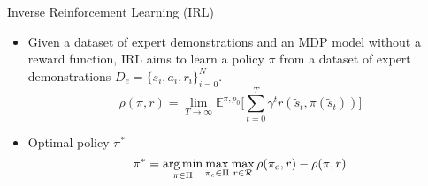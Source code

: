
\begin{block}{\normalsize{Inverse Reinforcement Learning (IRL)}}
  \begin{itemize}
     \item Given a dataset of expert demonstrations and an MDP model without a reward function, IRL aims to learn a policy $\pi$ 
       from a dataset of expert demonstrations $D_e = \{ s_i, a_i, r_i \}_{i=0}^{N}$.
     \[
       \rho(\pi, r) = \lim_{T \to \infty} \mathbb{E}^{\pi, p_0} \lbrack \sum_{t=0}^{T} \gamma^t r(\tilde{s}_t, \pi(\tilde{s}_t)) \rbrack
     \]
     \item Optimal policy $\pi^* $
     \[
       \pi^* = \operatorname*{arg\,min}_{\pi \in \Pi} \max_{\pi_e \in \Pi} \max_{r \in \mathcal{R}} \rho(\pi_e, r) - \rho(\pi, r)
     \]
    
\end{itemize}
\end{block}





